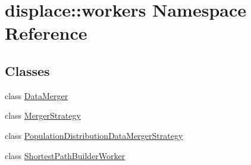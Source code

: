\hypertarget{namespacedisplace_1_1workers}{}\section{displace\+::workers Namespace Reference}
\label{namespacedisplace_1_1workers}
\subsection*{Classes}
\begin{DoxyCompactItemize}
\item 
class \mbox{\hyperlink{classdisplace_1_1workers_1_1_data_merger}{Data\+Merger}}
\item 
class \mbox{\hyperlink{classdisplace_1_1workers_1_1_merger_strategy}{Merger\+Strategy}}
\item 
class \mbox{\hyperlink{classdisplace_1_1workers_1_1_population_distribution_data_merger_strategy}{Population\+Distribution\+Data\+Merger\+Strategy}}
\item 
class \mbox{\hyperlink{classdisplace_1_1workers_1_1_shortest_path_builder_worker}{Shortest\+Path\+Builder\+Worker}}
\end{DoxyCompactItemize}
